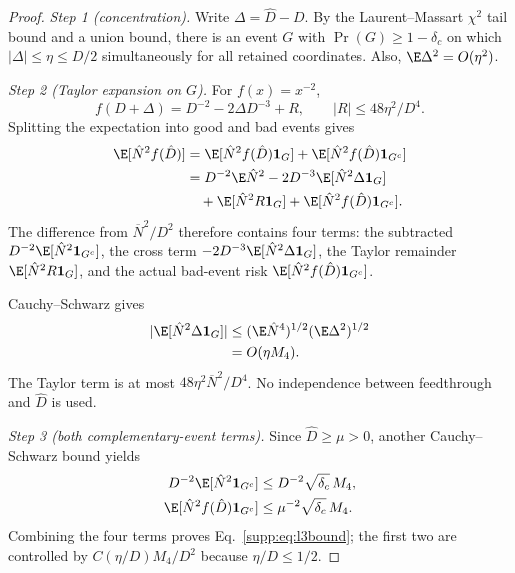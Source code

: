 \begin{proof}
\emph{Step 1 (concentration).}
Write $\Delta=\hat D-D$. By the Laurent--Massart $\chi^2$ tail bound and a union bound, there is an event $G$ with $\Pr(G)\ge1-\delta_c$ on which $|\Delta|\le\eta\le D/2$ simultaneously for all retained coordinates. Also, $\E\Delta^2=O(\eta^2)$.

\emph{Step 2 (Taylor expansion on $G$).}
For $f(x)=x^{-2}$,
\begin{equation}
  f(D+\Delta)=D^{-2}-2\Delta D^{-3}+R,
  \qquad |R|\le48\eta^2/D^4 .
  \label{supp:eq:taylorlead}
\end{equation}
Splitting the expectation into good and bad events gives
\begin{align}
  \E[\hat N^2f(\hat D)]
  &=\E[\hat N^2f(\hat D)\mathbf 1_G]
  +\E[\hat N^2f(\hat D)\mathbf 1_{G^c}] \notag\\
  &=D^{-2}\E\hat N^2
  -2D^{-3}\E[\hat N^2\Delta\mathbf 1_G] \notag\\
  &\quad+\E[\hat N^2R\mathbf 1_G]
  +\E[\hat N^2f(\hat D)\mathbf 1_{G^c}].
  \label{supp:eq:eventdecomp}
\end{align}
The difference from $\overline N^2/D^2$ therefore contains four terms: the subtracted $D^{-2}\E[\hat N^2\mathbf 1_{G^c}]$, the cross term $-2D^{-3}\E[\hat N^2\Delta\mathbf 1_G]$, the Taylor remainder $\E[\hat N^2R\mathbf 1_G]$, and the actual bad-event risk $\E[\hat N^2f(\hat D)\mathbf 1_{G^c}]$.

Cauchy--Schwarz gives
\begin{align}
  |\E[\hat N^2\Delta\mathbf 1_G]|
  &\le (\E\hat N^4)^{1/2}(\E\Delta^2)^{1/2} \notag\\
  &=O(\eta M_4).
  \label{supp:eq:crosslead}
\end{align}
The Taylor term is at most $48\eta^2\overline N^2/D^4$. No independence between feedthrough and $\hat D$ is used.

\emph{Step 3 (both complementary-event terms).}
Since $\hat D\ge\mu>0$, another Cauchy--Schwarz bound yields
\begin{align}
  D^{-2}\E[\hat N^2\mathbf 1_{G^c}]
  &\le D^{-2}\sqrt{\delta_c}\,M_4, \notag\\
  \E[\hat N^2f(\hat D)\mathbf 1_{G^c}]
  &\le \mu^{-2}\sqrt{\delta_c}\,M_4.
  \label{supp:eq:badlead}
\end{align}
Combining the four terms proves Eq.~\eqref{supp:eq:l3bound}; the first two are controlled by $C(\eta/D)M_4/D^2$ because $\eta/D\le1/2$.
\end{proof}

